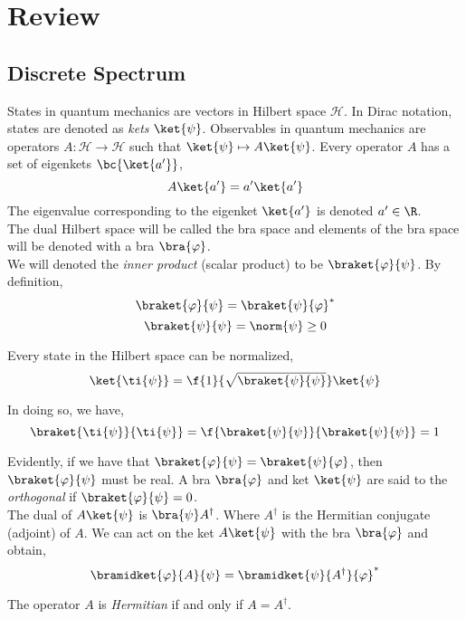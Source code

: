 \documentclass{article}
\newcommand{\hilb}{\mathcal{H}}
\begin{document}
\titlePage

\tableOfContents

\disclaimer

\section{Review}

\subsection{Discrete Spectrum}
States in quantum mechanics are vectors in Hilbert space $\hilb$. In Dirac notation, states are denoted as \textit{kets} $\ket{\psi}$. Observables in quantum mechanics are operators $A : \hilb \to \hilb$ such that $\ket{\psi} \mapsto A \ket{\psi}$. Every operator $A$ has a set of eigenkets $\bc{\ket{a'}}$,
\[ A \ket{a'} = a' \ket{a'} \]
The eigenvalue corresponding to the eigenket $\ket{a'}$ is denoted $a' \in \R$. \\

The dual Hilbert space will be called the bra space and elements of the bra space will be denoted with a bra $\bra{\varphi}$.\\

We will denoted the \textit{inner product} (scalar product) to be $\braket{\varphi}{\psi}$. By definition,
\[ \braket{\varphi}{\psi} = \braket{\psi}{\varphi}^{*} \]
\[ \braket{\psi}{\psi} = \norm{\psi} \geq 0 \]

Every state in the Hilbert space can be normalized,
\[ \ket{\ti{\psi}} = \f{1}{\sqrt{\braket{\psi}{\psi}}} \ket{\psi} \]

In doing so, we have,
\[ \braket{\ti{\psi}}{\ti{\psi}} = \f{\braket{\psi}{\psi}}{\braket{\psi}{\psi}} = 1 \]

Evidently, if we have that $\braket{\varphi}{\psi} = \braket{\psi}{\varphi}$, then $\braket{\varphi}{\psi}$ must be real. A bra $\bra{\varphi}$ and ket $\ket{\psi}$ are said to the \textit{orthogonal} if $\braket{\varphi}{\psi} = 0$. \\

The dual of $A \ket{\psi}$ is $\bra{\psi} A^\dagger$. Where $A^{\dagger}$ is the Hermitian conjugate (adjoint) of $A$. We can act on the ket $A\ket{\psi}$ with the bra $\bra{\varphi}$ and obtain,
\[ \bramidket{\varphi}{A}{\psi} = \bramidket{\psi}{A^\dagger}{\varphi}^{*} \]

The operator $A$ is \textit{Hermitian} if and only if $A = A^{\dagger}$. \\
\end{document}
